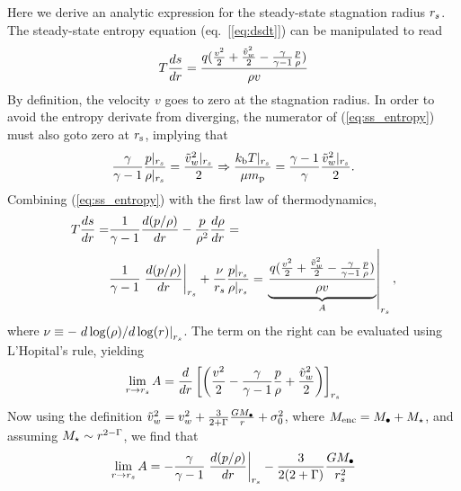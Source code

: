 Here we derive an analytic expression for the steady-state stagnation
radius $r_s$.  The steady-state entropy equation
(eq.~[\ref{eq:dsdt}]) can be manipulated to read
\begin{align}
T\frac{d s}{d r}=\frac{q (\frac{v^2}{2}+\frac{\tilde{v}_{w}^2}{2}-\frac{\gamma}{\gamma-1} \frac{p}{\rho})}{\rho v} \label{eq:ss_entropy}
\end{align}
By definition, the velocity $v$ goes to zero at the stagnation radius.  In order to avoid the entropy derivate from diverging, the numerator of (\ref{eq:ss_entropy}) must also goto zero at $r_{\rm s}$, implying that
\begin{align}
 \frac{\gamma}{\gamma-1} \frac{p|_{r_s}}{\rho|_{r_s}}=\frac{\tilde{v}_{w}^{2}|_{r_s}}{2} \Rightarrow \frac{k_{\rm b} T|_{r_s}}{\mu m_{\rm p}}=\frac{\gamma-1}{\gamma} \frac{\tilde{v}_{w}^{2}|_{r_s}}{2} .
\label{eq:appTanalytic}
\end{align}
Combining (\ref{eq:ss_entropy}) with the first law of thermodynamics,
\begin{align}
T\frac{d s}{d r} =& \frac{1}{\gamma-1}\frac{d (p/\rho)}{d r}-\frac{p}{\rho^2}\frac{d \rho}{d r} = \\
& 
\frac{1}{\gamma-1}\left.\frac{d (p/\rho)}{d r}\right|_{r_s}+\frac{\nu}{r_s}  \frac{p|_{r_s}}{\rho|_{r_s}}=\left.\underbrace{\frac{q (\frac{v^2}{2}+\frac{\tilde{v}_{w}^2}{2}-\frac{\gamma}{\gamma-1} \frac{p}{\rho})}{\rho  v}}_{A}\right|_{r_s}, 
 \label{eq:first_law}
\end{align}
where $\nu\equiv -\left.d\log(\rho)/d\log(r)\right|_{r_s}$.  The term on the right can be evaluated using L'Hopital's rule, yielding
\begin{align}
  \lim_{r \rightarrow r_s} A = \frac{d}{dr} \left[\left(\frac{v^2}{2} -\frac{\gamma}{\gamma-1} \frac{p}{\rho}+\frac{\tilde{v}_{w}^2}{2}\right)\right]_{r_s}
\end{align}
Now using the definition $\tilde{v}_{w}^2=v_{w}^2+ \frac{3}{2+\Gamma} \frac{G M_{\bullet}}{r} +
\sigma_0^2$, where $M_{\rm enc}=M_{\bullet}+M_{\star}$, and assuming $M_{\star} \sim
r^{2-\Gamma}$, we find that
\begin{align}
\lim_{r \rightarrow r_s} A=-\frac{\gamma}{\gamma-1}
\left.\frac{d (p/\rho)}{d r}\right|_{r_s}-\frac{3}{2(2+\Gamma)} \frac{G M_{\bullet}}{r_s^2}
\end{align}
